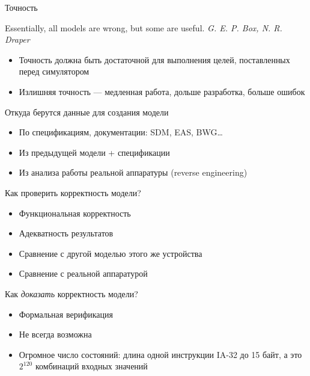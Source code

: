 \documentclass{beamer}
\begin{document}
\begin{frame}{Точность}

\begin{flushright}
\tiny{Essentially, all models are wrong, but some are useful. \textit{G. E. P. Box, N. R. Draper}}
\end{flushright}

\begin{itemize}
\item Точность должна быть достаточной для выполнения целей, поставленных перед симулятором
\item Излишняя точность — медленная работа, дольше разработка, больше ошибок
\end{itemize}

\end{frame}

\begin{frame}{Откуда берутся данные для создания модели}

\begin{itemize}
\item По спецификациям, документации: SDM, EAS, BWG\dots
\item Из предыдущей модели + спецификации
\item Из анализа работы реальной аппаратуры (reverse engineering)
\end{itemize}

\end{frame}

\begin{frame}{Как проверить корректность модели?}

\begin{itemize}
\item Функциональная корректность
\item Адекватность результатов
\item Сравнение с другой моделью этого же устройства
\item Сравнение с реальной аппаратурой
\end{itemize}
\end{frame}

\begin{frame}{Как \textit{доказать} корректность модели?}

\begin{itemize}
\item Формальная верификация
\item Не всегда возможна
\item Огромное число состояний: длина одной инструкции IA-32 до 15 байт, а это $2^{120}$ комбинаций входных значений
\end{itemize}
\end{frame}
\end{document}
